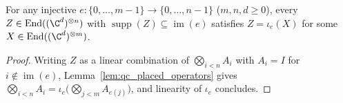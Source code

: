 \begin{lemma}
    \label{thm:qc_supported_operator_placement}
    \leanok
    For any injective $e\colon\{0,\ldots,m-1\}\to\{0,\ldots,n-1\}$ ($m,n,d\ge 0$),
    every $Z\in\operatorname{End}((\C^d)^{\otimes n})$ with
    $\operatorname{supp}(Z)\subseteq\operatorname{im}(e)$ satisfies
    $Z=\iota_e(X)$ for some $X\in\operatorname{End}((\C^d)^{\otimes m})$.
\end{lemma}
\begin{proof}\leanok
    Writing $Z$ as a linear combination of $\bigotimes_{i<n}A_i$ with $A_i=I$
    for $i\notin\operatorname{im}(e)$, Lemma~\ref{lem:qc_placed_operators} gives
    $\bigotimes_{i<n}A_i=\iota_e\bigl(\bigotimes_{j<m}A_{e(j)}\bigr)$, and
    linearity of $\iota_e$ concludes.
\end{proof}

